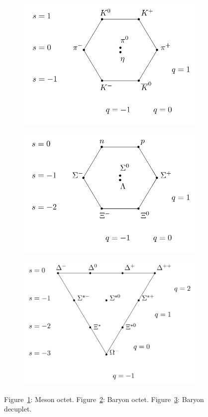 	\begin{figure}[H]
		\begin{subfigure}{\linewidth}
			\centering
			\includegraphics[width=0.4\linewidth]{fig/chapt2/Meson_octet.png}\\
			\caption{\label{fig:Eightfold:A}}
		\end{subfigure}
		\begin{subfigure}{0.5\linewidth}
			\centering
			\includegraphics[width=0.8\linewidth]{fig/chapt2/Baryon_octet.png}
			\caption{\label{fig:Eightfold:B}}
		\end{subfigure}
		\begin{subfigure}{0.5\linewidth}
			\centering
			\includegraphics[width=0.8\linewidth]{fig/chapt2/Baryon_decuplet.png}
			\caption{\label{fig:Eightfold:C}}
		\end{subfigure}
		\caption{\label{fig:Eightfold} Figure~\ref{fig:Eightfold:A}: Meson octet. Figure~\ref{fig:Eightfold:B}: Baryon octet. Figure~\ref{fig:Eightfold:C}: Baryon decuplet.}
	\end{figure}
	
